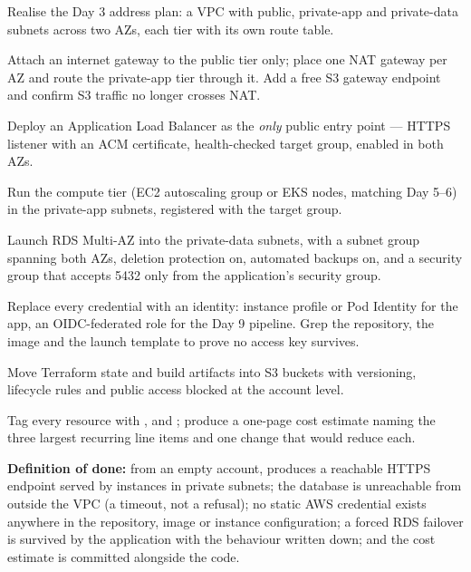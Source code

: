 \begin{buildalong}
\begin{wbitem}
  \item Realise the Day 3 address plan: a VPC with public, private-app and private-data subnets across two AZs, each tier with its own route table.
  \item Attach an internet gateway to the public tier only; place one NAT gateway per AZ and route the private-app tier through it. Add a free S3 gateway endpoint and confirm S3 traffic no longer crosses NAT.
  \item Deploy an Application Load Balancer as the \emph{only} public entry point --- HTTPS listener with an ACM certificate, health-checked target group, enabled in both AZs.
  \item Run the compute tier (EC2 autoscaling group or EKS nodes, matching Day 5--6) in the private-app subnets, registered with the target group.
  \item Launch RDS Multi-AZ into the private-data subnets, with a subnet group spanning both AZs, deletion protection on, automated backups on, and a security group that accepts 5432 only from the application's security group.
  \item Replace every credential with an identity: instance profile or Pod Identity for the app, an OIDC-federated role for the Day 9 pipeline. Grep the repository, the image and the launch template to prove no access key survives.
  \item Move Terraform state and build artifacts into S3 buckets with versioning, lifecycle rules and public access blocked at the account level.
  \item Tag every resource with ,  and ; produce a one-page cost estimate naming the three largest recurring line items and one change that would reduce each.
\end{wbitem}
\smallskip\textbf{Definition of done:} from an empty account,  produces a reachable HTTPS endpoint served by instances in private subnets; the database is unreachable from outside the VPC (a timeout, not a refusal); no static AWS credential exists anywhere in the repository, image or instance configuration; a forced RDS failover is survived by the application with the behaviour written down; and the cost estimate is committed alongside the code.
\end{buildalong}


